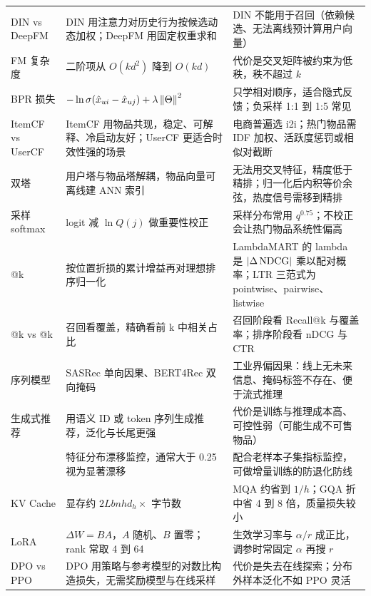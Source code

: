 \begin{xltabular}{\textwidth}{L{2.5cm} L{4.4cm} L{7.2cm}}
DIN vs DeepFM & DIN 用注意力对历史行为按候选动态加权；DeepFM 用固定权重求和 & DIN 不能用于召回（依赖候选、无法离线预计算用户向量） \\

FM 复杂度 & 二阶项从 $O(kd^2)$ 降到 $O(kd)$ & 代价是交叉矩阵被约束为低秩，秩不超过 $k$ \\

BPR 损失 & $-\ln\sigma(\hat{x}_{ui}-\hat{x}_{uj})+\lambda\left\lVert \Theta \right\rVert^2$ & 只学相对顺序，适合隐式反馈；负采样 1:1 到 1:5 常见 \\

ItemCF vs UserCF & ItemCF 用物品共现，稳定、可解释、冷启动友好；UserCF 更适合时效性强的场景 & 电商普遍选 i2i；热门物品需 IDF 加权、活跃度惩罚或相似对截断 \\

双塔 & 用户塔与物品塔解耦，物品向量可离线建 ANN 索引 & 无法用交叉特征，精度低于精排；归一化后内积等价余弦，热度信号需移到精排 \\

采样 softmax & logit 减 $\ln Q(j)$ 做重要性校正 & 采样分布常用 $q^{0.75}$；不校正会让热门物品系统性偏高 \\

@k & 按位置折损的累计增益再对理想排序归一化 & LambdaMART 的 lambda 是 $\left\lvert \Delta \operatorname{NDCG} \right\rvert$ 乘以配对概率；LTR 三范式为 pointwise、pairwise、listwise \\

@k vs @k & 召回看覆盖，精确看前 k 中相关占比 & 召回阶段看 Recall@k 与覆盖率；排序阶段看 nDCG 与 CTR \\

序列模型 & SASRec 单向因果、BERT4Rec 双向掩码 & 工业界偏因果：线上无未来信息、掩码标签不存在、便于流式推理 \\

生成式推荐 & 用语义 ID 或 token 序列生成推荐，泛化与长尾更强 & 代价是训练与推理成本高、可控性弱（可能生成不可售物品） \\

 & 特征分布漂移监控，通常大于 0.25 视为显著漂移 & 配合老样本子集指标监控，可做增量训练的防退化防线 \\

KV Cache & 显存约 $2Lbnhd_h\times$ 字节数 & MQA 约省到 $1/h$；GQA 折中省 4 到 8 倍，质量损失较小 \\

LoRA & $\Delta W=BA$，$A$ 随机、$B$ 置零；rank 常取 4 到 64 & 生效学习率与 $\alpha/r$ 成正比，调参时常固定 $\alpha$ 再搜 $r$ \\

DPO vs PPO & DPO 用策略与参考模型的对数比构造损失，无需奖励模型与在线采样 & 代价是失去在线探索；分布外样本泛化不如 PPO 灵活 \\

\end{xltabular}

